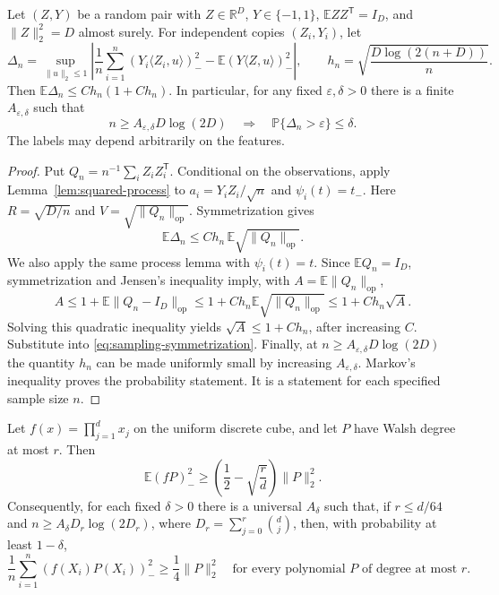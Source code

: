 \begin{lemma}
\label{lem:squared-sampling}
Let $(Z,Y)$ be a random pair with $Z\in\mathbb R^D$, $Y\in\{-1,1\}$,
$\mathbb E ZZ^{\mathsf T}=I_D$, and $\|Z\|_2^2=D$ almost surely.
For independent copies $(Z_i,Y_i)$, let
\[
 \Delta_n=\sup_{\|u\|_2\le1}
 \left|\frac1n\sum_{i=1}^n(Y_i\langle Z_i,u\rangle)_-^2
          -\mathbb E(Y\langle Z,u\rangle)_-^2\right|,
 \qquad h_n=\sqrt{\frac{D\log(2(n+D))}{n}}.
\]
Then $\mathbb E\Delta_n\le C h_n(1+C h_n)$.
In particular, for any fixed $\varepsilon,\delta>0$ there is a finite
$A_{\varepsilon,\delta}$ such that
\[
 n\ge A_{\varepsilon,\delta}D\log(2D)
 \quad\Longrightarrow\quad
 \mathbb P\{\Delta_n>\varepsilon\}\le\delta.
\]
The labels may depend arbitrarily on the features.
\end{lemma}

\begin{proof}
Put $Q_n=n^{-1}\sum_iZ_iZ_i^{\mathsf T}$.
Conditional on the observations, apply
Lemma~\ref{lem:squared-process} to
$a_i=Y_iZ_i/\sqrt n$ and $\psi_i(t)=t_-$.
Here $R=\sqrt{D/n}$ and $V=\sqrt{\|Q_n\|_{\mathrm{op}}}$.
Symmetrization gives
\begin{equation}\label{eq:sampling-symmetrization}
 \mathbb E\Delta_n
 \le C h_n\,\mathbb E\sqrt{\|Q_n\|_{\mathrm{op}}}.
\end{equation}
We also apply the same process lemma with $\psi_i(t)=t$.
Since $\mathbb E Q_n=I_D$, symmetrization and Jensen's inequality imply,
with $A=\mathbb E\|Q_n\|_{\mathrm{op}}$,
\[
 A\le1+\mathbb E\|Q_n-I_D\|_{\mathrm{op}}
 \le1+C h_n\mathbb E\sqrt{\|Q_n\|_{\mathrm{op}}}
 \le1+C h_n\sqrt A.
\]
Solving this quadratic inequality yields $\sqrt A\le1+C h_n$,
after increasing $C$. Substitute into
\eqref{eq:sampling-symmetrization}.
Finally, at $n\ge A_{\varepsilon,\delta}D\log(2D)$ the quantity
$h_n$ can be made uniformly small by increasing
$A_{\varepsilon,\delta}$. Markov's inequality proves the probability
statement. It is a statement for each specified sample size $n$.
\end{proof}

\begin{lemma}
\label{lem:parity-squared-balance}
Let $f(x)=\prod_{j=1}^d x_j$ on the uniform discrete cube, and let $P$
have Walsh degree at most $r$. Then
\begin{equation}\label{eq:parity-squared-balance}
 \mathbb E(fP)_-^2
 \ge\left(\frac12-\sqrt{\frac rd}\right)\|P\|_2^2.
\end{equation}
Consequently, for each fixed $\delta>0$ there is a universal
$A_\delta$ such that, if $r\le d/64$ and
$n\ge A_\delta D_r\log(2D_r)$, where
$D_r=\sum_{j=0}^r\binom dj$, then, with probability at least $1-\delta$,
\begin{equation}\label{eq:wrong-square-coercivity}
 \frac1n\sum_{i=1}^n(f(X_i)P(X_i))_-^2
 \ge\frac14\|P\|_2^2
 \quad\text{for every polynomial $P$ of degree at most $r$}.
\end{equation}
\end{lemma}


